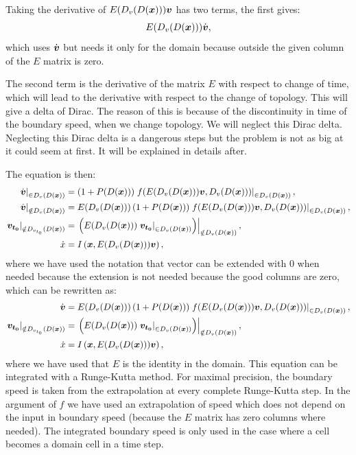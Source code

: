 Taking the derivative of $E(D_v(D({\boldsymbol {x}}))){\boldsymbol {v}}$ has two terms, the first gives:
\begin{equation}
	E(D_v(D({\boldsymbol {x}})))\dot{{\boldsymbol {v}}},
\end{equation}
which uses $\dot{{\boldsymbol {v}}}$ but needs it only for the domain because outside the given column of the $E$ matrix is zero.

The second term is the derivative of the matrix $E$ with respect to change of time, which will lead to the derivative with respect to the change of topology.
This will give a delta of Dirac.
The reason of this is because of the discontinuity in time of the boundary speed, when we change topology.
We will neglect this Dirac delta. Neglecting this Dirac delta is a dangerous steps but the problem is not as big at it could seem at first.
It will be explained in details after.

The equation is then:
\begin{align}
	\left.\dot{{\boldsymbol {v}}}\right|_{\in D_{v}(D({\boldsymbol {x}}))}&=\left(1+P(D({\boldsymbol {x}}))\right)\left.f(E(D_v(D({\boldsymbol {x}}))){\boldsymbol {v}},D_{v}(D({\boldsymbol {x}})))\right|_{\in D_{v}(D({\boldsymbol {x}}))},\\
	\left.\dot{{\boldsymbol {v}}}\right|_{\notin D_{v}(D({\boldsymbol {x}}))}&=E(D_v(D({\boldsymbol {x}})))\left(1+P(D({\boldsymbol {x}}))\right)\left.f(E(D_v(D({\boldsymbol {x}}))){\boldsymbol {v}},D_{v}(D({\boldsymbol {x}})))\right|_{\in D_{v}(D({\boldsymbol {x}}))},\\
	\left.{\boldsymbol {v_{t_0}}}\right|_{\notin D_{v_{t_0}}(D({\boldsymbol {x}}))}&=\left.\left(E(D_v(D({\boldsymbol {x}})))\left.{\boldsymbol {v_{t_0}}}\right|_{\in D_{v}(D({\boldsymbol {x}}))}\right)\right|_{\notin D_{v}(D({\boldsymbol {x}}))},\\
	\dot{x}&=I\left({\boldsymbol {x}},E(D_v(D({\boldsymbol {x}}))){\boldsymbol {v}}\right),\\
\end{align}
where we have used the notation that vector can be extended with 0 when needed because the extension is not needed because the good columns are zero,
which can be rewritten as:
\begin{align}\label{topo:equ:onediff}
	\dot{{\boldsymbol {v}}}&=E(D_v(D({\boldsymbol {x}})))\left(1+P(D({\boldsymbol {x}}))\right)\left.f(E(D_v(D({\boldsymbol {x}}))){\boldsymbol {v}},D_{v}(D({\boldsymbol {x}})))\right|_{\in D_{v}(D({\boldsymbol {x}}))},\\
	\left.{\boldsymbol {v_{t_0}}}\right|_{\notin D_{v_{t_0}}(D({\boldsymbol {x}}))}&=\left.\left(E(D_v(D({\boldsymbol {x}})))\left.{\boldsymbol {v_{t_0}}}\right|_{\in D_{v}(D({\boldsymbol {x}}))}\right)\right|_{\notin D_{v}(D({\boldsymbol {x}}))},\\
	\dot{x}&=I\left({\boldsymbol {x}},E(D_v(D({\boldsymbol {x}}))){\boldsymbol {v}}\right),\\
\end{align}
where we have used that $E$ is the identity in the domain.
This equation can be integrated with a Runge-Kutta method.
For maximal precision, the boundary speed is taken from the extrapolation at every complete Runge-Kutta step.
In the argument of $f$ we have used an extrapolation of speed which does not depend on the input in boundary speed (because the $E$ matrix has zero columns where needed).
The integrated boundary speed is only used in the case where a cell becomes a domain cell in a time step.

